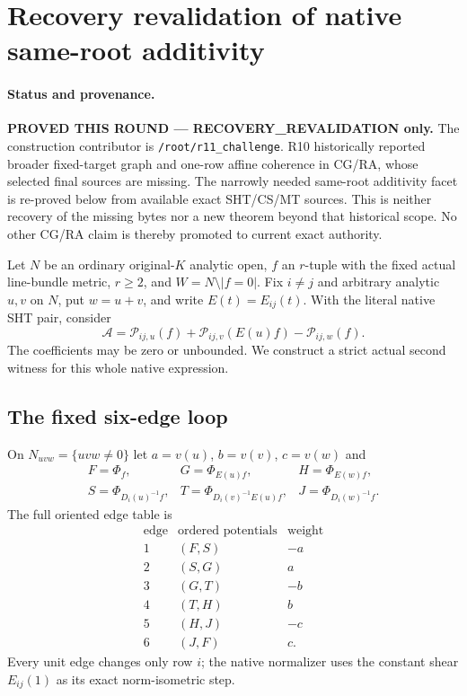 \section{Recovery revalidation of native same-root additivity}
\label{sec:r11-same-root-additivity-revalidation}

\paragraph{Status and provenance.}
\textbf{PROVED THIS ROUND --- RECOVERY\_REVALIDATION only.}
The construction contributor is \texttt{/root/r11\_challenge}.
R10 historically reported broader fixed-target graph and one-row
affine coherence in CG/RA, whose selected final sources are missing.
The narrowly needed same-root additivity facet is re-proved below
from available exact SHT/CS/MT sources.  This is neither recovery of
the missing bytes nor a new theorem beyond that historical scope.
No other CG/RA claim is thereby promoted to current exact authority.

Let $N$ be an ordinary original-$K$ analytic open, $f$ an $r$-tuple
with the fixed actual line-bundle metric, $r\ge2$, and
$W=N\setminus|f=0|$.  Fix $i\ne j$ and arbitrary analytic $u,v$
on $N$, put $w=u+v$, and write $E(t)=E_{ij}(t)$.  With the literal
native SHT pair, consider
\[
 \mathscr A=\mathcal P_{ij,u}(f)
     +\mathcal P_{ij,v}(E(u)f)-\mathcal P_{ij,w}(f).
 \tag{SAR1}
\]
The coefficients may be zero or unbounded.  We construct a strict
actual second witness for this whole native expression.

\subsection{The fixed six-edge loop}

On $N_{uvw}=\{uvw\ne0\}$ let $a=v(u)$, $b=v(v)$, $c=v(w)$ and
\[
 \begin{array}{lll}
 F=\Phi_f,&G=\Phi_{E(u)f},&H=\Phi_{E(w)f},\\
 S=\Phi_{D_i(u)^{-1}f},&
 T=\Phi_{D_i(v)^{-1}E(u)f},&
 J=\Phi_{D_i(w)^{-1}f}.
 \end{array}
 \tag{SAR2}
\]
The full oriented edge table is
\[
\begin{array}{c|c|c}
 \text{edge}&\text{ordered potentials}&\text{weight}\\\hline
 1&(F,S)&-a\\
 2&(S,G)&a\\
 3&(G,T)&-b\\
 4&(T,H)&b\\
 5&(H,J)&-c\\
 6&(J,F)&c.
\end{array}
\tag{SAR3}
\]
Every unit edge changes only row $i$; the native normalizer uses
the constant shear $E_{ij}(1)$ as its exact norm-isometric step.

